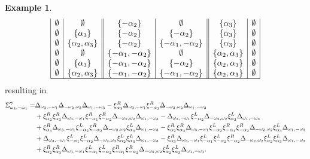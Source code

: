 \documentclass[a4paper]{amsart}
\theoremstyle{definition}
\newtheorem{example}[theorem]{Example}
\begin{document}
\begin{example}
\[\begin{array}{|c|c||c|c||c|c|}
      \emptyset & \emptyset             & \{-\alpha_2\} & \emptyset               & \{\alpha_3\} & \emptyset \\
      \emptyset & \{\alpha_3\}          & \{-\alpha_2\} & \{-\alpha_2\}           & \{\alpha_3\} & \emptyset \\
      \emptyset & \{\alpha_2,\alpha_3\} & \{-\alpha_2\} & \{-\alpha_1,-\alpha_2\} & \{\alpha_3\} & \emptyset \\
      
      \emptyset & \emptyset             & \{-\alpha_1,-\alpha_2\} & \emptyset               & \{\alpha_2,\alpha_3\} & \emptyset \\
      \emptyset & \{\alpha_3\}          & \{-\alpha_1,-\alpha_2\} & \{-\alpha_2\}           & \{\alpha_2,\alpha_3\} & \emptyset \\
      \emptyset & \{\alpha_2,\alpha_3\} & \{-\alpha_1,-\alpha_2\} & \{-\alpha_1,-\alpha_2\} & \{\alpha_2,\alpha_3\} & \emptyset \\
      \hline
    \end{array}
  \]
  resulting in 
  \begin{align*}
    \function[\omega_3][-\omega_1]
    = &
    \minor[\omega_3][-\omega_1] \minor[-\omega_2][\omega_2] \minor[\omega_1][-\omega_3]
    -
    \xi_{\alpha_3}^R\minor[\omega_3][-\omega_1] \xi_{-\alpha_2}^R\minor[-\omega_2][\omega_2] \minor[\omega_1][-\omega_3]
    \\
    &+
    \xi_{\alpha_2}^R\xi_{\alpha_3}^R\minor[\omega_3][-\omega_1] \xi_{-\alpha_1}^R\xi_{-\alpha_2}^R\minor[-\omega_2][\omega_2] \minor[\omega_1][-\omega_3]
    -
    \minor[\omega_3][-\omega_1] \xi_{-\alpha_2}^L\minor[-\omega_2][\omega_2] \xi_{\alpha_3}^L\minor[\omega_1][-\omega_3]
    \\
    &+
    \xi_{\alpha_3}^R\minor[\omega_3][-\omega_1] \xi_{-\alpha_2}^L\xi_{-\alpha_2}^R\minor[-\omega_2][\omega_2] \xi_{\alpha_3}^L\minor[\omega_1][-\omega_3]
    -
    \xi_{\alpha_2}^R\xi_{\alpha_3}^R\minor[\omega_3][-\omega_1] \xi_{-\alpha_2}^L\xi_{-\alpha_1}^R\xi_{-\alpha_2}^R\minor[-\omega_2][\omega_2] \xi_{\alpha_3}^L\minor[\omega_1][-\omega_3]
    \\
    &+
    \minor[\omega_3][-\omega_1] \xi_{-\alpha_1}^L\xi_{-\alpha_2}^L\minor[-\omega_2][\omega_2] \xi_{\alpha_2}^L\xi_{\alpha_3}^L\minor[\omega_1][-\omega_3]
    -
    \xi_{\alpha_3}^R\minor[\omega_3][-\omega_1] \xi_{-\alpha_1}^L\xi_{-\alpha_2}^L\xi_{-\alpha_2}^R\minor[-\omega_2][\omega_2] \xi_{\alpha_2}^L\xi_{\alpha_3}^L\minor[\omega_1][-\omega_3]
    \\
    &+
    \xi_{\alpha_2}^R\xi_{\alpha_3}^R\minor[\omega_3][-\omega_1] \xi_{-\alpha_1}^L\xi_{-\alpha_2}^L\xi_{-\alpha_1}^R\xi_{-\alpha_2}^R\minor[-\omega_2][\omega_2] \xi_{\alpha_2}^L\xi_{\alpha_3}^L\minor[\omega_1][-\omega_3]
    .
  \end{align*}
\end{example}
\end{document}
